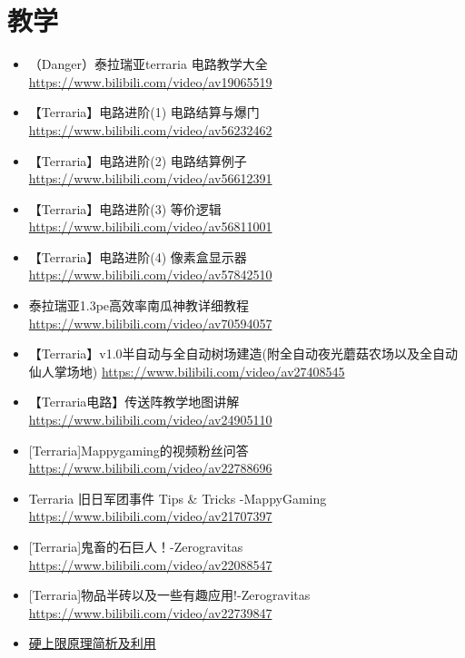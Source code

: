 \section{教学}
\begin{itemize}
\item （Danger）泰拉瑞亚terraria 电路教学大全 \url{https://www.bilibili.com/video/av19065519}
\item 【Terraria】电路进阶(1) 电路结算与爆门 \url{https://www.bilibili.com/video/av56232462}
\item 【Terraria】电路进阶(2) 电路结算例子 \url{https://www.bilibili.com/video/av56612391}
\item 【Terraria】电路进阶(3) 等价逻辑 \url{https://www.bilibili.com/video/av56811001}
\item 【Terraria】电路进阶(4) 像素盒显示器 \url{https://www.bilibili.com/video/av57842510}
\item 泰拉瑞亚1.3pe高效率南瓜神教详细教程 \url{https://www.bilibili.com/video/av70594057}
\item 【Terraria】v1.0半自动与全自动树场建造(附全自动夜光蘑菇农场以及全自动仙人掌场地) \url{https://www.bilibili.com/video/av27408545}
\item 【Terraria电路】传送阵教学地图讲解 \url{https://www.bilibili.com/video/av24905110}
\item {[}Terraria]Mappygaming的视频粉丝问答 \url{https://www.bilibili.com/video/av22788696}
\item Terraria 旧日军团事件 Tips \& Tricks -MappyGaming \url{https://www.bilibili.com/video/av21707397}
\item {[}Terraria]鬼畜的石巨人！-Zerogravitas \url{https://www.bilibili.com/video/av22088547}
\item {[}Terraria]物品半砖以及一些有趣应用!-Zerogravitas \url{https://www.bilibili.com/video/av22739847}
\item \href{https://www.bilibili.com/video/BV1aa4y1t7VH?p=2}{硬上限原理简析及利用}
\end{itemize}

